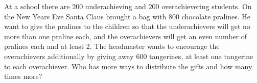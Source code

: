 \problem
At a school there are $200$ underachieving and $200$ overachievering students.
On the New Years Eve Santa Claus brought a bag with 800 chocolate pralines.
He want to give the pralines to the children so that the underachievers
will get no more than one praline each, and the overachievers will get
an even number of pralines each and at least 2.
The headmaster wants to encourage the overachievers additionally by giving away
600 tangerines, at least one tangerine to each overachiever.
Who has more ways to distribute the gifts and how many times more?
\solution
\endproblem
